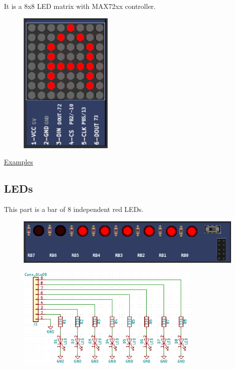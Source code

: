 It is a 8x8 LED matrix with MAX72xx controller.

\begin{figure}[H]
\center
\includegraphics[width=0.4\textwidth]{img/part_LED_matrix.png} 
\end{figure}

\href{https://lcgamboa.github.io/picsimlab_examples/Parts.html\#LED_Matrix}{Examples}

\subsection{LEDs}

This part is a bar of 8 independent red LEDs.

\begin{figure}[H]
\center
\includegraphics[width=0.99\textwidth]{img/part_leds.png} 
\end{figure} 

\begin{figure}[H]
\center
\includegraphics[width=0.8\textwidth]{img/part_leds_.png} 
\end{figure} 

